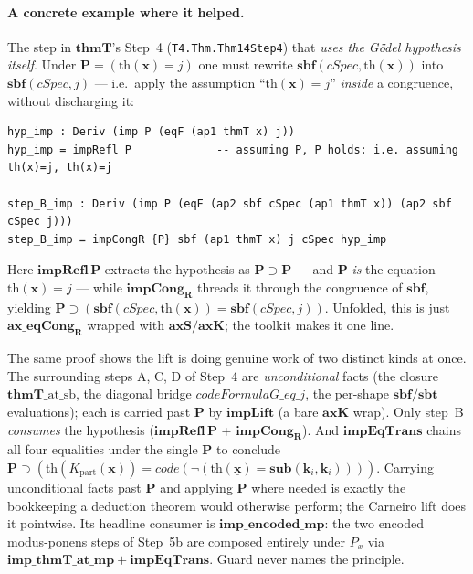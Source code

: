 \documentclass[11pt]{article}
\theoremstyle{plain}
\theoremstyle{definition}
\theoremstyle{remark}
\newcommand{\code}[1]{\mathit{code}(#1)}
\newcommand{\sub}{\mathbf{sub}}
\newcommand{\sbf}{\mathbf{sbf}}
\newcommand{\sbt}{\mathbf{sbt}}
\newcommand{\thmT}{\mathbf{thmT}}
\begin{document}
\paragraph{A concrete example where it helped.}  The step in
$\thmT$'s Step~4 (\verb|T4.Thm.Thm14Step4|) that \emph{uses the
G\"odel hypothesis itself}.  Under $\mathbf{P} = (\mathrm{th}(\mathbf{x})
= j)$ one must rewrite $\sbf(\mathit{cSpec}, \mathrm{th}(\mathbf{x}))$
into $\sbf(\mathit{cSpec}, j)$ --- i.e.\ apply the assumption
``$\mathrm{th}(\mathbf{x}) = j$'' \emph{inside} a congruence, without
discharging it:
\begin{lstlisting}
hyp_imp : Deriv (imp P (eqF (ap1 thmT x) j))
hyp_imp = impRefl P             -- assuming P, P holds: i.e. assuming th(x)=j, th(x)=j

step_B_imp : Deriv (imp P (eqF (ap2 sbf cSpec (ap1 thmT x)) (ap2 sbf cSpec j)))
step_B_imp = impCongR {P} sbf (ap1 thmT x) j cSpec hyp_imp
\end{lstlisting}
Here $\mathbf{impRefl}\,\mathbf{P}$ extracts the hypothesis as
$\mathbf{P} \supset \mathbf{P}$ --- and $\mathbf{P}$ \emph{is} the
equation $\mathrm{th}(\mathbf{x}) = j$ --- while $\mathbf{impCong_R}$
threads it through the congruence of $\sbf$, yielding
$\mathbf{P} \supset (\sbf(\mathit{cSpec}, \mathrm{th}(\mathbf{x})) =
\sbf(\mathit{cSpec}, j))$.  Unfolded, this is just $\mathbf{ax\_eqCong_R}$
wrapped with $\mathbf{axS}/\mathbf{axK}$; the toolkit makes it one line.

The same proof shows the lift is doing genuine work of two distinct
kinds at once.  The surrounding steps A, C, D of Step~4 are
\emph{unconditional} facts (the closure $\thmT\_\mathrm{at}\_\mathrm{sb}$,
the diagonal bridge $\mathit{codeFormulaG\_eq\_j}$, the per-shape
$\sbf/\sbt$ evaluations); each is carried past $\mathbf{P}$ by
$\mathbf{impLift}$ (a bare $\mathbf{axK}$ wrap).  Only step~B
\emph{consumes} the hypothesis ($\mathbf{impRefl}\,\mathbf{P}$ +
$\mathbf{impCong_R}$).  And $\mathbf{impEqTrans}$ chains all four equalities
under the single $\mathbf{P}$ to conclude
$\mathbf{P} \supset (\mathrm{th}(K_{\mathrm{part}}(\mathbf{x})) =
\code{\neg(\mathrm{th}(\underline{\mathbf{x}}) = \sub(\mathbf{k}_i,\mathbf{k}_i))})$.
Carrying unconditional facts past $\mathbf{P}$ and applying $\mathbf{P}$
where needed is exactly the bookkeeping a deduction theorem would
otherwise perform; the Carneiro lift does it pointwise.  Its headline
consumer is $\mathbf{imp\_encoded\_mp}$: the two encoded modus-ponens
steps of Step~5b are composed entirely under $P_x$ via
$\mathbf{imp\_thmT\_at\_mp} + \mathbf{impEqTrans}$.  Guard never names the
principle.
\end{document}
